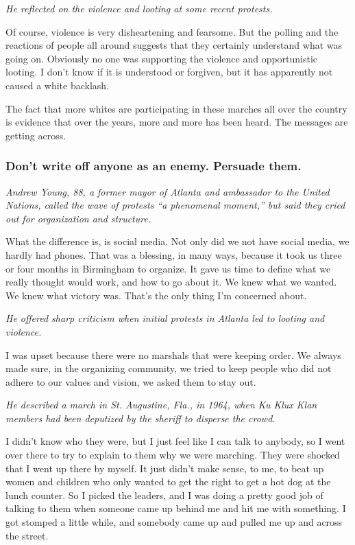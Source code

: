 \emph{He reflected on the violence and looting at some recent protests.}

Of course, violence is very disheartening and fearsome. But the polling
and the reactions of people all around suggests that they certainly
understand what was going on. Obviously no one was supporting the
violence and opportunistic looting. I don't know if it is understood or
forgiven, but it has apparently not caused a white backlash.

The fact that more whites are participating in these marches all over
the country is evidence that over the years, more and more has been
heard. The messages are getting across.

\hypertarget{dont-write-off-anyone-as-an-enemy-persuade-them}{%
\subsubsection{Don't write off anyone as an enemy. Persuade
them.}\label{dont-write-off-anyone-as-an-enemy-persuade-them}}

\emph{Andrew Young, 88, a former mayor of Atlanta and ambassador to the
United Nations, called the wave of protests ``a phenomenal moment,'' but
said they cried out for organization and structure.}

What the difference is, is social media. Not only did we not have social
media, we hardly had phones. That was a blessing, in many ways, because
it took us three or four months in Birmingham to organize. It gave us
time to define what we really thought would work, and how to go about
it. We knew what we wanted. We knew what victory was. That's the only
thing I'm concerned about.

\emph{He offered sharp criticism when initial protests in Atlanta led to
looting and violence.}

I was upset because there were no marshals that were keeping order. We
always made sure, in the organizing community, we tried to keep people
who did not adhere to our values and vision, we asked them to stay out.

\emph{He described a march in St. Augustine, Fla., in 1964, when Ku Klux
Klan members had been deputized by the sheriff to disperse the crowd.}

I didn't know who they were, but I just feel like I can talk to anybody,
so I went over there to try to explain to them why we were marching.
They were shocked that I went up there by myself. It just didn't make
sense, to me, to beat up women and children who only wanted to get the
right to get a hot dog at the lunch counter. So I picked the leaders,
and I was doing a pretty good job of talking to them when someone came
up behind me and hit me with something. I got stomped a little while,
and somebody came up and pulled me up and across the street.

